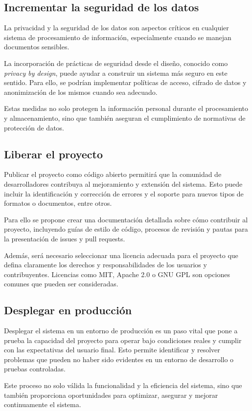\subsection*{Incrementar la seguridad de los datos}

La privacidad y la seguridad de los datos son aspectos críticos en cualquier sistema de procesamiento de información,
especialmente cuando se manejan documentos sensibles.

La incorporación de prácticas de seguridad desde el diseño, conocido como \textit{privacy by design}, puede ayudar a
construir un sistema más seguro en este sentido.
Para ello, se podrían implementar políticas de acceso, cifrado de datos y anonimización de los mismos cuando sea
adecuado.

Estas medidas no solo protegen la información personal durante el procesamiento y almacenamiento, sino que también
aseguran el cumplimiento de normativas de protección de datos.


\subsection*{Liberar el proyecto}

Publicar el proyecto como código abierto permitirá que la comunidad de desarrolladores contribuya al mejoramiento y
extensión del sistema.
Esto puede incluir la identificación y corrección de errores y el soporte para nuevos tipos de formatos o documentos,
entre otros.

Para ello se propone crear una documentación detallada sobre cómo contribuir al proyecto, incluyendo guías de estilo
de código, procesos de revisión y pautas para la presentación de issues y pull requests.

Además, será necesario seleccionar una licencia adecuada para el proyecto que defina claramente los derechos y
responsabilidades de los usuarios y contribuyentes.
Licencias como MIT, Apache 2.0 o GNU GPL son opciones comunes que pueden ser consideradas.

\subsection*{Desplegar en producción}

Desplegar el sistema en un entorno de producción es un paso vital que pone a prueba la capacidad del proyecto para
operar bajo condiciones reales y cumplir con las expectativas del usuario final.
Esto permite identificar y resolver problemas que pueden no haber sido evidentes en un entorno de desarrollo o
pruebas controladas.

Este proceso no solo válida la funcionalidad y la eficiencia del sistema, sino que también proporciona oportunidades
para optimizar, asegurar y mejorar continuamente el sistema.